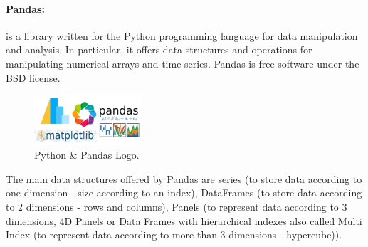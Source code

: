 \paragraph*{Pandas:} 

is a library\cite{PandasPythonData} written for the Python programming language for data manipulation and analysis. In particular, it offers data structures and operations for manipulating numerical arrays and time series. Pandas is free software under the BSD license.


\begin{figure}
	\vspace{-10pt}
	\includegraphics[width=4cm]{images/chapter4/python_pandas.png}
	\vspace{-10pt}
	\caption{{\footnotesize Python \& Pandas Logo.}}
\end{figure}


The main data structures offered by Pandas are series (to store data according to one dimension - size according to an index), DataFrames (to store data according to 2 dimensions - rows and columns), Panels (to represent data according to 3 dimensions, 4D Panels or Data Frames with hierarchical indexes also called Multi Index (to represent data according to more than 3 dimensions - hypercube))\cite{Pandas2020}.



